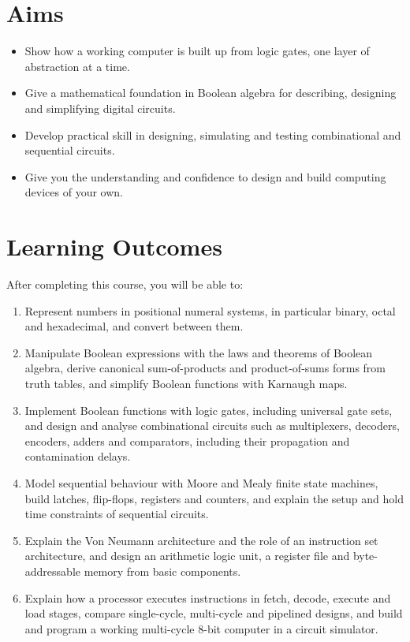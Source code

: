 \documentclass[11pt,a4paper]{article}
\begin{document}
\section{Aims}
\begin{itemize}
  \item Show how a working computer is built up from logic gates, one layer of
        abstraction at a time.
  \item Give a mathematical foundation in Boolean algebra for describing,
        designing and simplifying digital circuits.
  \item Develop practical skill in designing, simulating and testing combinational
        and sequential circuits.
  \item Give you the understanding and confidence to design and build computing
        devices of your own.
\end{itemize}

\section{Learning Outcomes}
After completing this course, you will be able to:
\begin{enumerate}[label=LO\arabic*.]
  \item Represent numbers in positional numeral systems, in particular binary,
        octal and hexadecimal, and convert between them.
  \item Manipulate Boolean expressions with the laws and theorems of Boolean
        algebra, derive canonical sum-of-products and product-of-sums forms from
        truth tables, and simplify Boolean functions with Karnaugh maps.
  \item Implement Boolean functions with logic gates, including universal gate
        sets, and design and analyse combinational circuits such as multiplexers,
        decoders, encoders, adders and comparators, including their propagation
        and contamination delays.
  \item Model sequential behaviour with Moore and Mealy finite state machines,
        build latches, flip-flops, registers and counters, and explain the setup
        and hold time constraints of sequential circuits.
  \item Explain the Von Neumann architecture and the role of an instruction set
        architecture, and design an arithmetic logic unit, a register file and
        byte-addressable memory from basic components.
  \item Explain how a processor executes instructions in fetch, decode, execute and
        load stages, compare single-cycle, multi-cycle and pipelined designs, and
        build and program a working multi-cycle 8-bit computer in a circuit
        simulator.
\end{enumerate}
\end{document}
